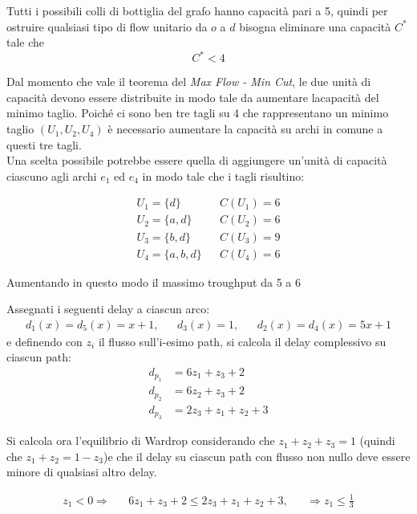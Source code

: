 \documentclass[11pt,largemargins]{homework}
\begin{document}
  \begin{alphaparts}
    \questionpart
    Tutti i possibili colli di bottiglia del grafo hanno capacità pari a 5, quindi per ostruire qualsiasi tipo di flow unitario da \(o\) a \(d\) bisogna eliminare una capacità \(C^*\) tale che
    \begin{equation*}
      C^*<4
    \end{equation*}

    \questionpart
    Dal momento che vale il teorema del \textit{Max Flow - Min Cut}, le due unità di capacità devono essere distribuite in modo tale da aumentare lacapacità del minimo taglio. Poiché ci sono ben tre tagli su 4 che rappresentano un minimo taglio \((U_1, U_2, U_4)\) è necessario aumentare la capacità su archi in comune a questi tre tagli.\\
    Una scelta possibile potrebbe essere quella di aggiungere un'unità di capacità ciascuno agli archi \(e_1\) ed \(e_4\) in modo tale che i tagli risultino:
    
  \begin{align*}
    U_1 = \{d\}\  && C(U_1)=6 \\
    U_2 = \{a, d\} && C(U_2)=6 \\
    U_3 = \{b,d\} && C(U_3)=9 \\
    U_4 = \{a,b,d\} && C(U_4)=6
  \end{align*}

  Aumentando in questo modo il massimo troughput da 5 a 6


  \questionpart
  Assegnati i seguenti delay a ciascun arco:
  \begin{align*}
    d_1(x)=d_5(x)=x+1, && d_3(x)=1, && d_2(x)=d_4(x)=5x+1
  \end{align*}
  e definendo con \(z_i\) il flusso sull'i-esimo path, si calcola il delay complessivo su ciascun path:
  \begin{align*}
    d_{p_1}&=6z_1+z_3+2 \\
    d_{p_2}&=6z_2+z_3+2 \\
    d_{p_3}&=2z_3+z_1+z_2+3
  \end{align*}

  Si calcola ora l'equilibrio di Wardrop considerando che \(z_1+z_2+z_3=1\) (quindi che \(z_1+z_2=1-z_3\))e che il delay su ciascun path con flusso non nullo deve essere minore di qualsiasi altro delay.

  \begin{align*}
      z_1<0 \Rightarrow  && 6z_1 + z_3 + 2 \leq 2z_3+z_1+z_2+3,  && \Rightarrow z_1 \leq \frac{1}{3}
    \end{align*}


\end{alphaparts}
\end{document}
